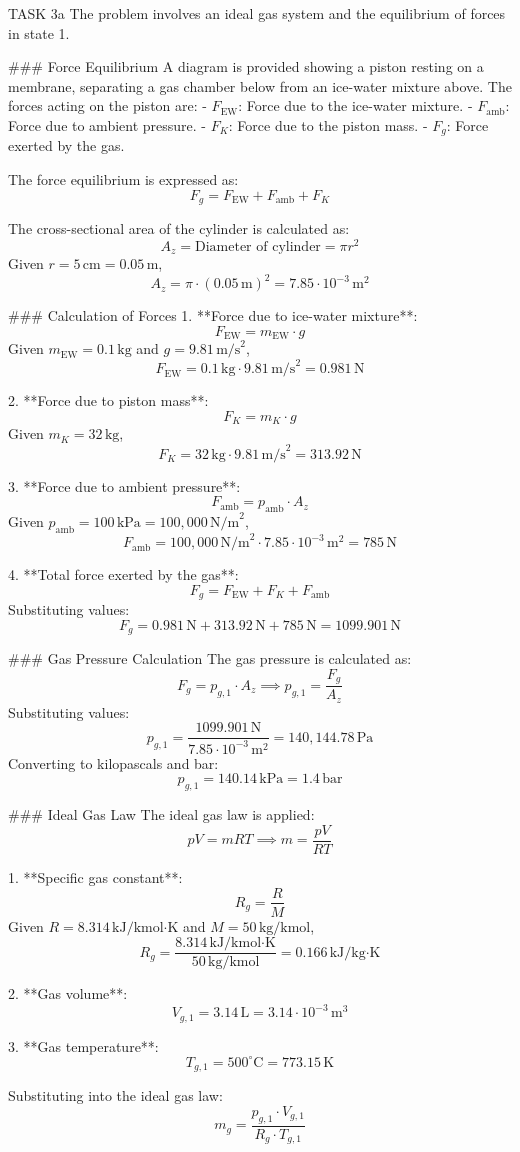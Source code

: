 TASK 3a  
The problem involves an ideal gas system and the equilibrium of forces in state 1.  

### Force Equilibrium  
A diagram is provided showing a piston resting on a membrane, separating a gas chamber below from an ice-water mixture above. The forces acting on the piston are:  
- \( F_{\text{EW}} \): Force due to the ice-water mixture.  
- \( F_{\text{amb}} \): Force due to ambient pressure.  
- \( F_K \): Force due to the piston mass.  
- \( F_g \): Force exerted by the gas.  

The force equilibrium is expressed as:  
\[
F_g = F_{\text{EW}} + F_{\text{amb}} + F_K
\]

The cross-sectional area of the cylinder is calculated as:  
\[
A_z = \text{Diameter of cylinder} = \pi r^2
\]
Given \( r = 5 \, \text{cm} = 0.05 \, \text{m} \),  
\[
A_z = \pi \cdot (0.05 \, \text{m})^2 = 7.85 \cdot 10^{-3} \, \text{m}^2
\]

### Calculation of Forces  
1. **Force due to ice-water mixture**:  
\[
F_{\text{EW}} = m_{\text{EW}} \cdot g
\]
Given \( m_{\text{EW}} = 0.1 \, \text{kg} \) and \( g = 9.81 \, \text{m/s}^2 \),  
\[
F_{\text{EW}} = 0.1 \, \text{kg} \cdot 9.81 \, \text{m/s}^2 = 0.981 \, \text{N}
\]

2. **Force due to piston mass**:  
\[
F_K = m_K \cdot g
\]
Given \( m_K = 32 \, \text{kg} \),  
\[
F_K = 32 \, \text{kg} \cdot 9.81 \, \text{m/s}^2 = 313.92 \, \text{N}
\]

3. **Force due to ambient pressure**:  
\[
F_{\text{amb}} = p_{\text{amb}} \cdot A_z
\]
Given \( p_{\text{amb}} = 100 \, \text{kPa} = 100,000 \, \text{N/m}^2 \),  
\[
F_{\text{amb}} = 100,000 \, \text{N/m}^2 \cdot 7.85 \cdot 10^{-3} \, \text{m}^2 = 785 \, \text{N}
\]

4. **Total force exerted by the gas**:  
\[
F_g = F_{\text{EW}} + F_K + F_{\text{amb}}
\]
Substituting values:  
\[
F_g = 0.981 \, \text{N} + 313.92 \, \text{N} + 785 \, \text{N} = 1099.901 \, \text{N}
\]

### Gas Pressure Calculation  
The gas pressure is calculated as:  
\[
F_g = p_{g,1} \cdot A_z \implies p_{g,1} = \frac{F_g}{A_z}
\]
Substituting values:  
\[
p_{g,1} = \frac{1099.901 \, \text{N}}{7.85 \cdot 10^{-3} \, \text{m}^2} = 140,144.78 \, \text{Pa}
\]
Converting to kilopascals and bar:  
\[
p_{g,1} = 140.14 \, \text{kPa} = 1.4 \, \text{bar}
\]

### Ideal Gas Law  
The ideal gas law is applied:  
\[
pV = mRT \implies m = \frac{pV}{RT}
\]

1. **Specific gas constant**:  
\[
R_g = \frac{R}{M}
\]
Given \( R = 8.314 \, \text{kJ/kmol·K} \) and \( M = 50 \, \text{kg/kmol} \),  
\[
R_g = \frac{8.314 \, \text{kJ/kmol·K}}{50 \, \text{kg/kmol}} = 0.166 \, \text{kJ/kg·K}
\]

2. **Gas volume**:  
\[
V_{g,1} = 3.14 \, \text{L} = 3.14 \cdot 10^{-3} \, \text{m}^3
\]

3. **Gas temperature**:  
\[
T_{g,1} = 500^\circ\text{C} = 773.15 \, \text{K}
\]

Substituting into the ideal gas law:  
\[
m_g = \frac{p_{g,1} \cdot V_{g,1}}{R_g \cdot T_{g,1}}
\]